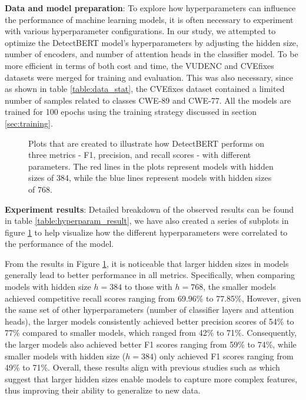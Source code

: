 \documentclass{ieeeaccess}
\begin{document}
\par \textbf{Data and model preparation}: To explore how hyperparameters can influence the performance of machine learning models, it is often necessary to experiment with various hyperparameter configurations. In our study, we attempted to optimize the DetectBERT model's hyperparameters by adjusting the hidden size, number of encoders, and number of attention heads in the classifier model. To be more efficient in terms of both cost and time,  the VUDENC and CVEfixes datasets were merged for training and evaluation. This was also necessary, since as shown in table \ref{table:data_stat}, the CVEfixes dataset contained a limited number of samples related to classes CWE-89 and CWE-77.  All the models are trained for 100 epochs using the training strategy discussed in section \ref{sec:training}.

\begin{figure}[h]
    \centering
    
    
    \caption{Plots that are created to illustrate how DetectBERT performs on three metrics - F1, precision, and recall  scores - with different parameters. The red lines in the plots represent models with hidden sizes of 384, while the blue lines represent models with hidden sizes of 768.}
 \label{fig:RQ1_graphs}
\end{figure}


\par \textbf{Experiment results}: Detailed breakdown of the observed results can be found in table \ref{table:hyperparam_result}, we have also created a series of subplots in figure \ref{fig:RQ1_graphs} to help visualize how the different hyperparameters were correlated to the performance of the model.
\par From the results in Figure \ref{fig:RQ1_graphs}, it is noticeable that larger hidden sizes in models generally lead to better performance in all metrics. Specifically,  when comparing models with hidden size $h=384$ to those with $h=768$,  the smaller models achieved competitive recall scores ranging from 69.96\% to 77.85\%,  However, given the same set of other hyperparameters (number of classifier layers and attention heads), the larger models consistently achieved better precision scores of 54\% to 77\% compared to smaller models, which ranged from 42\% to 71\%. Consequently, the larger models also achieved better F1 scores ranging from 59\% to 74\%, while smaller models with hidden size ($h=384$) only achieved F1 scores ranging from 49\% to 71\%. Overall, these results align with previous studies such as \cite{attention, bert} which suggest that larger hidden sizes enable models to capture more complex features, thus improving their ability to generalize to new data. 
\end{document}
